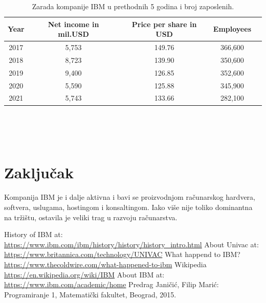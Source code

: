 \documentclass[a4paper]{article}
\begin{document}
\begin{table}[h!]
\begin{center}
\caption{Zarada kompanije IBM u prethodnih 5 godina i broj zaposlenih. \cite{tabela}}
\begin{tabular}{|c|c|c|c|c|} \hline
Year& Net income in mil.USD& Price per share in USD& Employees \\ \hline
2017	&5,753		&149.76	&366,600\\ \hline
2018	&8,723		&139.90	&350,600\\ \hline
2019	&9,400		&126.85	&352,600\\ \hline
2020	&5,590	  &125.88	&345,900\\ \hline
2021	&5,743		&133.66	&282,100\\ \hline
\end{tabular}
\label{tab:tabela1}
\end{center}
\end{table} \\ \\ \\

\section{Zaključak}
Kompanija IBM je i dalje aktivna i bavi se proizvodnjom računarskog hardvera, softvera, uslugama, hostingom i konsaltingom. Iako više nije toliko dominantna na tržištu, ostavila je veliki trag u razvoju računarstva. 
\pagebreak
{}
\renewcommand{\refname}{Literatura}
\begin{thebibliography}{10}

 History of IBM at:\\ \url{https://www.ibm.com/ibm/history/history/history_intro.html}
 About Univac at: \url{https://www.britannica.com/technology/UNIVAC}
 What happend to IBM?\\ \url{https://www.thecoldwire.com/what-happened-to-ibm}
 Wikipedia \url{https://en.wikipedia.org/wiki/IBM} %
 About IBM at: \url{https://www.ibm.com/academic/home}
 Predrag Janičić, Filip Marić: Programiranje 1, Matematički fakultet, Beograd, 2015.
\end{thebibliography}
\end{document}
